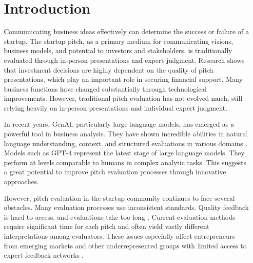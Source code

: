 \chapter{Introduction}

\label{ch:introduction}

Communicating business ideas effectively can determine the success or failure of a startup. The startup pitch, as a primary medium for communicating visions, business models, and potential to investors and stakeholders, is traditionally evaluated through in-person presentations and expert judgment.  Research shows that investment decisions are highly dependent on the quality of pitch presentations, which play an important role in securing financial support\cite{masterpresentat}. Many business functions have changed substantially through technological improvements. However, traditional pitch evaluation has not evolved much, still relying heavily on in-person presentations and individual expert judgment.

In recent years, GenAI, particularly large language models, has emerged as a powerful tool in business analysis. They have shown incredible abilities in natural language understanding, context, and structured evaluations in various domains \cite{Ozince2024}. Models such as GPT-4 represent the latest stage of large language models. They perform at levels comparable to humans in complex analytic tasks. This suggests a great potential to improve pitch evaluation processes through innovative approaches\cite{gpt}.

However, pitch evaluation in the startup community continues to face several obstacles. Many evaluation processes use inconsistent standards. Quality feedback is hard to access, and evaluations take too long \cite{StartupEvaluati, Kalvapalle2024}. Current evaluation methods require significant time for each pitch and often yield vastly different interpretations among evaluators. These issues especially affect  entrepreneurs from emerging markets and other underrepresented groups with limited access to expert feedback networks \cite{BreakingBarrier}.


